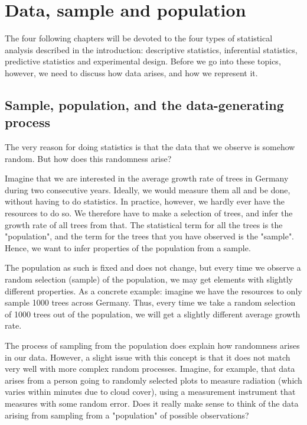 \documentclass[a4paper,twoside]{tufte-book}\usepackage[]{graphicx}\usepackage[]{color}
\begin{document}
\chapter{Data, sample and population}

The four following chapters will be devoted to the four types of statistical analysis described in the introduction: descriptive statistics, inferential statistics, predictive statistics and experimental design. Before we go into these topics, however, we need to discuss how data arises, and how we represent it. 

\section{Sample, population, and the data-generating process}

The very reason for doing statistics is that the data that we observe is somehow random. But how does this randomness arise?

Imagine  that we are interested in the average growth rate of trees in Germany during two consecutive years. Ideally, we would measure them all and be done, without having to do statistics. In practice, however, we hardly ever have the resources to do so. We therefore have to make a selection of trees, and infer the growth rate of all trees from that. The statistical term for all the trees is the "population", and the term for the trees that you have observed is the "sample". Hence, we want to infer properties of the population from a sample.

The  population as such is fixed and does not change, but every time we observe a random selection (sample) of the population, we may get elements with slightly different properties. As a concrete example: imagine we have the resources to only sample 1000 trees across Germany. Thus, every time we take a random selection of 1000 trees out of the population, we will get a slightly different average growth rate.

The process of sampling from the population does explain how randomness arises in our data. However, a slight issue with this concept is that it does not match very well with more complex random processes. Imagine, for example, that data arises from a person going to randomly selected plots to measure radiation (which varies within minutes due to cloud cover), using a measurement instrument that measures with some random error. Does it really make sense to think of the data arising from sampling from a "population" of possible observations?
\end{document}
